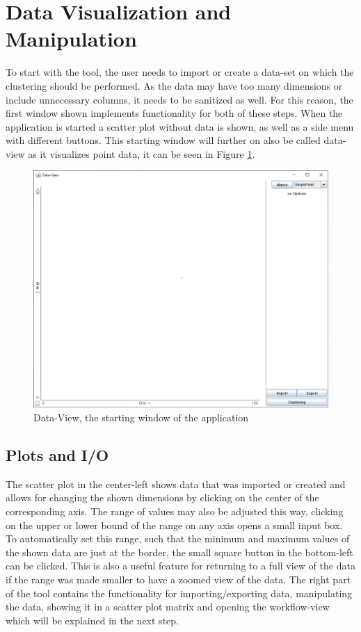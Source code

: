\documentclass[
	a4paper,
	english,
	twoside,
	openright,               
	11pt                            
	]{report}
\begin{document}
\section{Data Visualization and Manipulation}
To start with the tool, the user needs to import or create a data-set on which the clustering should be performed. As the data may have too many dimensions or include unnecessary columns, it needs to be sanitized as well. For this reason, the first window shown implements functionality for both of these steps. When the application is started a scatter plot without data is shown, as well as a side menu with different buttons. This starting window will further on also be called data-view as it visualizes point data, it can be seen in Figure \ref{fig:data-view}. 

\begin{figure}[h]
	\centering
	\includegraphics[scale=.45]{data-view}
	\caption{Data-View, the starting window of the application}
	\label{fig:data-view}
\end{figure}

\subsection{Plots and I/O}\label{sec:plotio}

The scatter plot in the center-left shows data that was imported or created and allows for changing the shown dimensions by clicking on the center of the corresponding axis. The range of values may also be adjusted this way, clicking on the upper or lower bound of the range on any axis opens a small input box. To automatically set this range, such that the minimum and maximum values of the shown data are just at the border, the small square button in the bottom-left can be clicked. This is also a useful feature for returning to a full view of the data if the range was made smaller to have a zoomed view of the data. The right part of the tool contains the functionality for importing/exporting data, manipulating the data, showing it in a scatter plot matrix and opening the workflow-view which will be explained in the next step.
\end{document}
